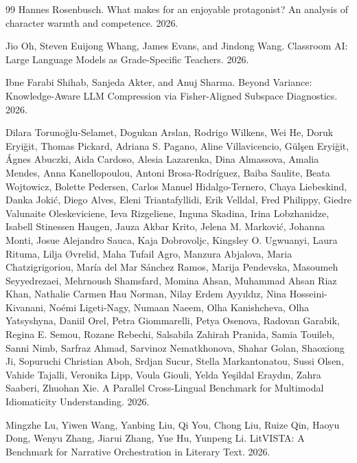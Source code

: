 \documentclass{article}
\begin{document}
\begin{thebibliography}{99}
Hannes Rosenbusch. What makes for an enjoyable protagonist? An analysis of character warmth and competence. 2026.

Jio Oh, Steven Euijong Whang, James Evans, and Jindong Wang. Classroom AI: Large Language Models as Grade-Specific Teachers. 2026.

Ibne Farabi Shihab, Sanjeda Akter, and Anuj Sharma. Beyond Variance: Knowledge-Aware LLM Compression via Fisher-Aligned Subspace Diagnostics. 2026.

Dilara Torunoğlu-Selamet, Dogukan Arslan, Rodrigo Wilkens, Wei He, Doruk Eryiğit, Thomas Pickard, Adriana S. Pagano, Aline Villavicencio, Gülşen Eryiğit, Ágnes Abuczki, Aida Cardoso, Alesia Lazarenka, Dina Almassova, Amalia Mendes, Anna Kanellopoulou, Antoni Brosa-Rodríguez, Baiba Saulite, Beata Wojtowicz, Bolette Pedersen, Carlos Manuel Hidalgo-Ternero, Chaya Liebeskind, Danka Jokić, Diego Alves, Eleni Triantafyllidi, Erik Velldal, Fred Philippy, Giedre Valunaite Oleskeviciene, Ieva Rizgeliene, Inguna Skadina, Irina Lobzhanidze, Isabell Stinessen Haugen, Jauza Akbar Krito, Jelena M. Marković, Johanna Monti, Josue Alejandro Sauca, Kaja Dobrovoljc, Kingsley O. Ugwuanyi, Laura Rituma, Lilja Øvrelid, Maha Tufail Agro, Manzura Abjalova, Maria Chatzigrigoriou, María del Mar Sánchez Ramos, Marija Pendevska, Masoumeh Seyyedrezaei, Mehrnoush Shamsfard, Momina Ahsan, Muhammad Ahsan Riaz Khan, Nathalie Carmen Hau Norman, Nilay Erdem Ayyıldız, Nina Hosseini-Kivanani, Noémi Ligeti-Nagy, Numaan Naeem, Olha Kanishcheva, Olha Yatsyshyna, Daniil Orel, Petra Giommarelli, Petya Osenova, Radovan Garabik, Regina E. Semou, Rozane Rebechi, Salsabila Zahirah Pranida, Samia Touileb, Sanni Nimb, Sarfraz Ahmad, Sarvinoz Nematkhonova, Shahar Golan, Shaoxiong Ji, Sopuruchi Christian Aboh, Srdjan Sucur, Stella Markantonatou, Sussi Olsen, Vahide Tajalli, Veronika Lipp, Voula Giouli, Yelda Yeşildal Eraydın, Zahra Saaberi, Zhuohan Xie. A Parallel Cross-Lingual Benchmark for Multimodal Idiomaticity Understanding. 2026.

Mingzhe Lu, Yiwen Wang, Yanbing Liu, Qi You, Chong Liu, Ruize Qin, Haoyu Dong, Wenyu Zhang, Jiarui Zhang, Yue Hu, Yunpeng Li. LitVISTA: A Benchmark for Narrative Orchestration in Literary Text. 2026.


\end{thebibliography}
\end{document}
